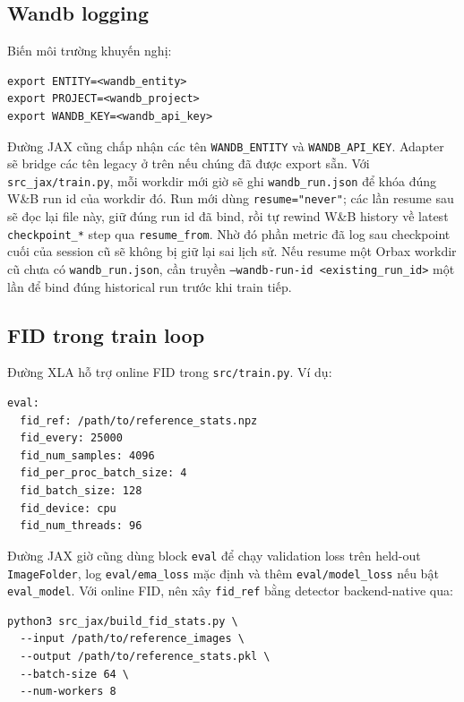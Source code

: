 \subsection{Wandb logging}

Biến môi trường khuyến nghị:

\begin{lstlisting}[style=rae]
export ENTITY=<wandb_entity>
export PROJECT=<wandb_project>
export WANDB_KEY=<wandb_api_key>
\end{lstlisting}

Đường JAX cũng chấp nhận các tên \texttt{WANDB\_ENTITY} và
\texttt{WANDB\_API\_KEY}. Adapter sẽ bridge các tên legacy ở trên nếu chúng đã
được export sẵn. Với \texttt{src\_jax/train.py}, mỗi workdir mới giờ sẽ ghi
\texttt{wandb\_run.json} để khóa đúng W\&B run id của workdir đó. Run mới dùng
\texttt{resume="never"}; các lần resume sau sẽ đọc lại file này, giữ đúng run
id đã bind, rồi tự rewind W\&B history về latest \texttt{checkpoint\_*} step
qua \texttt{resume\_from}. Nhờ đó phần metric đã log sau checkpoint cuối của
session cũ sẽ không bị giữ lại sai lịch sử. Nếu resume một Orbax workdir cũ chưa có
\texttt{wandb\_run.json}, cần truyền \texttt{--wandb-run-id <existing\_run\_id>}
một lần để bind đúng historical run trước khi train tiếp.

\subsection{FID trong train loop}

Đường XLA hỗ trợ online FID trong \texttt{src/train.py}. Ví dụ:

\begin{lstlisting}[style=rae]
eval:
  fid_ref: /path/to/reference_stats.npz
  fid_every: 25000
  fid_num_samples: 4096
  fid_per_proc_batch_size: 4
  fid_batch_size: 128
  fid_device: cpu
  fid_num_threads: 96
\end{lstlisting}

Đường JAX giờ cũng dùng block \texttt{eval} để chạy validation loss trên held-out
\texttt{ImageFolder}, log \texttt{eval/ema\_loss} mặc định và thêm
\texttt{eval/model\_loss} nếu bật \texttt{eval\_model}. Với online FID, nên xây
\texttt{fid\_ref} bằng detector backend-native qua:

\begin{lstlisting}[style=rae]
python3 src_jax/build_fid_stats.py \
  --input /path/to/reference_images \
  --output /path/to/reference_stats.pkl \
  --batch-size 64 \
  --num-workers 8
\end{lstlisting}

